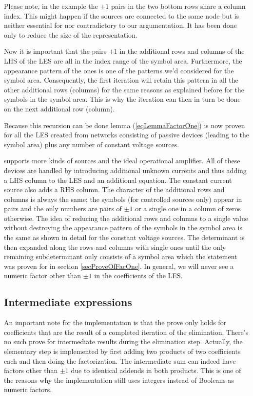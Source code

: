 Please note, in the example the $\pm 1$ pairs in the two bottom rows share
a column index. This might happen if the sources are connected to the same
node but is neither essential for nor contradictory to our argumentation.
It has been done only to reduce the size of the representation.

Now it is important that the pairs $\pm 1$ in the additional rows and
columns of the LHS of the LES are all in the index range of the symbol
area. Furthermore, the appearance pattern of the ones is one of the
patterns we'd considered for the symbol area. Consequently, the first
iteration will retain this pattern in all the other additional rows
(columns) for the same reasons as explained before for the symbols in the
symbol area. This is why the iteration can then in turn be done on the
next additional row (column).

Because this recursion can be done lemma (\ref{eqLemmaFactorOne}) is now
proven for all the LES created from networks consisting of passive devices
(leading to the symbol area) plus any number of constant voltage sources.

\linnet{} supports more kinds of sources and the ideal operational
amplifier. All of these devices are handled by introducing additional
unknown currents and thus adding a LHS column to the LES and an additional
equation. The constant current source also adds a RHS column. The
character of the additional rows and columns is always the same; the
symbols (for controlled sources only) appear in pairs and the only numbers
are pairs of $\pm 1$ or a single one in a column of zeros otherwise. The
idea of reducing the additional rows and columns to a single value without
destroying the appearance pattern of the symbols in the symbol area is the
same as shown in detail for the constant voltage sources. The determinant
is then expanded along the rows and columns with single ones until the
only remaining subdeterminant only consists of a symbol area which the
statement was proven for in section \ref{secProveOfFacOne}. In general, we
will never see a numeric factor other than $\pm 1$ in the coefficients of
the LES.


\subsection{Intermediate expressions}

An important note for the implementation is that the prove only holds for
coefficients that are the result of a completed iteration of the
elimination. There's no such prove for intermediate results during the
elimination step. Actually, the elementary step is implemented by first
adding two products of two coefficients each and then doing the
factorization. The intermediate sum can indeed have factors other than
$\pm 1$ due to identical addends in both products. This is one of the
reasons why the implementation still uses integers instead of Booleans as
numeric factors.

